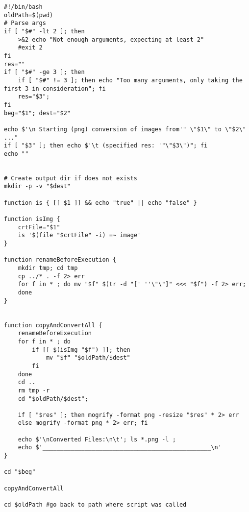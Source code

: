 \documentclass[french]{article}
\begin{document}
\begin{lstlisting}
#!/bin/bash
oldPath=$(pwd)
# Parse args
if [ "$#" -lt 2 ]; then 
    >&2 echo "Not enough arguments, expecting at least 2"
    #exit 2
fi
res=""
if [ "$#" -ge 3 ]; then 
    if [ "$#" != 3 ]; then echo "Too many arguments, only taking the first 3 in consideration"; fi
    res="$3";
fi
beg="$1"; dest="$2"

echo $'\n Starting (png) conversion of images from'" \"$1\" to \"$2\" ..." 
if [ "$3" ]; then echo $'\t (specified res: '"\"$3\")"; fi
echo ""


# Create output dir if does not exists
mkdir -p -v "$dest"

function is { [[ $1 ]] && echo "true" || echo "false" }

function isImg {
    crtFile="$1"
    is '$(file "$crtFile" -i) =~ image'
}

function renameBeforeExecution {
    mkdir tmp; cd tmp
    cp ../* . -f 2> err
    for f in * ; do mv "$f" $(tr -d "[' ''\"\"]" <<< "$f") -f 2> err;
    done 
}


function copyAndConvertAll {
    renameBeforeExecution
    for f in * ; do 
        if [[ $(isImg "$f") ]]; then
            mv "$f" "$oldPath/$dest"
        fi
    done
    cd ..
    rm tmp -r
    cd "$oldPath/$dest";

    if [ "$res" ]; then mogrify -format png -resize "$res" * 2> err
    else mogrify -format png * 2> err; fi

    echo $'\nConverted Files:\n\t'; ls *.png -l ;
    echo $'________________________________________________\n'
}

cd "$beg"

copyAndConvertAll 

cd $oldPath #go back to path where script was called


\end{lstlisting}


%
%
%
\end{document}
